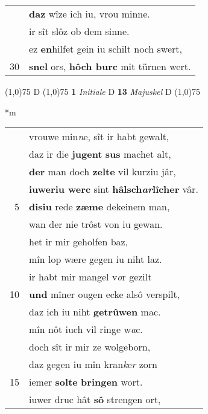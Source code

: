 \documentclass[8pt,a4paper,notitlepage]{article}
\begin{document}
\begin{table}[ht]
\begin{minipage}[t]{0.5\linewidth}
\begin{tabular}{rl}
 & \textbf{daz} wîze ich iu, vrou minne.\\ 
 & ir sît slôz ob dem sinne.\\ 
 & ez \textbf{en}hilfet gein iu schilt noch swert,\\ 
30 & \textbf{snel} ors, \textbf{hôch burc} mit türnen wert.\\ 
\end{tabular}
\scriptsize
\line(1,0){75} \newline
D \newline
\line(1,0){75} \newline
\textbf{1} \textit{Initiale} D  \textbf{13} \textit{Majuskel} D  \newline
\line(1,0){75} \newline
\newline
\end{minipage}
\hspace{0.5cm}
\begin{minipage}[t]{0.5\linewidth}
\small
\begin{center}*m
\end{center}
\begin{tabular}{rl}
 & vrouwe min\textit{n}e, sît ir habt gewalt,\\ 
 & daz ir die \textbf{jugent} \textbf{sus} machet alt,\\ 
 & \textbf{der} man doch \textbf{zelte} vil kurziu jâr,\\ 
 & \textbf{iuweriu werc} sint \textbf{hâlsch\textit{ar}lîcher} vâr.\\ 
5 & \textbf{disiu} rede \textbf{zæme} dekeinem man,\\ 
 & wan der nie trôst von iu gewan.\\ 
 & het ir mir geholfen baz,\\ 
 & mîn lop wære gegen iu niht laz.\\ 
 & ir habt mir mangel v\textit{o}r gezilt\\ 
10 & \textbf{und} mîner ougen ecke alsô verspilt,\\ 
 & daz ich iu niht \textbf{getrûwen} mac.\\ 
 & mîn nôt iuch vil ringe w\textit{a}c.\\ 
 & doch sît ir mir ze wolgeborn,\\ 
 & daz gegen iu mîn kran\textit{k}e\textit{r} zorn\\ 
15 & iemer \textbf{solte} \textbf{bringen} wort.\\ 
 & iuwer druc hât \textbf{sô} strengen ort,\\ 

\end{tabular}
\end{minipage}
\end{table}
\end{document}
